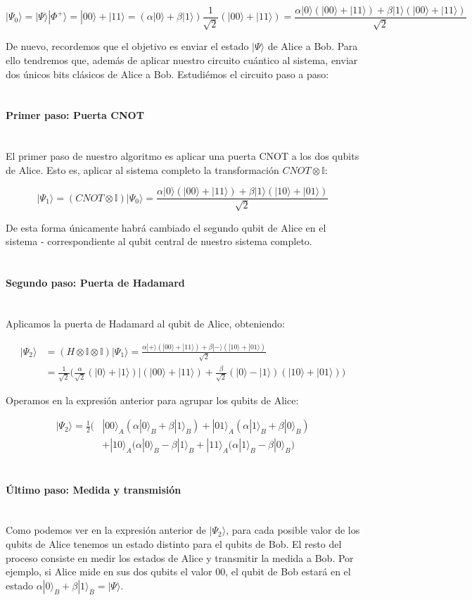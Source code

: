 \documentclass[11pt]{article}
\newcommand{\I}{\mathbb{I}}
\newcommand{\ra}{\rangle}
\newcommand{\myparagraph}[1]{\paragraph*{ \\ #1}\mbox{}\\}
\theoremstyle{plain}
\begin{document}
\[
	|\Psi_0\ra = |\Psi\ra|\Phi^+\ra = |00\ra + |11\ra = (\alpha|0\ra + \beta|1\ra) \frac{1}{\sqrt 2}(|00\ra + |11\ra) = \frac{\alpha|0\ra (|00\ra + |11\ra) + \beta|1\ra (|00\ra + |11\ra) }{\sqrt 2}
\]

De nuevo, recordemos que el objetivo es enviar el estado $|\Psi\ra$ de Alice a Bob. Para ello tendremos que, además de aplicar nuestro circuito cuántico al sistema, enviar dos únicos bits clásicos de Alice a Bob. Estudiémos el circuito paso a paso:

\myparagraph{Primer paso: Puerta CNOT}

El primer paso de nuestro algoritmo es aplicar una puerta CNOT a los dos qubits de Alice. Esto es, aplicar al sistema completo la transformación $CNOT \otimes \I$:


\[
	|\Psi_1\ra = (CNOT \otimes \I)|\Psi_0\ra = \frac{\alpha|0\ra (|00\ra + |11\ra) + \beta|1\ra (|10\ra + |01\ra) }{\sqrt 2}
\]

De esta forma únicamente habrá cambiado el segundo qubit de Alice en el sistema - correspondiente al qubit central de nuestro sistema completo.

\myparagraph{Segundo paso: Puerta de Hadamard}

Aplicamos la puerta de Hadamard al qubit de Alice, obteniendo:

\begin{align*}
	|\Psi_2\ra 	& = (H \otimes \I \otimes \I)|\Psi_1\ra = \frac{\alpha|+\ra (|00\ra + |11\ra) + \beta|-\ra (|10\ra + |01\ra) }{\sqrt 2} \\
				& = \frac{1}{\sqrt 2} \bigg( \frac{\alpha}{\sqrt 2}(|0\ra + |1\ra) | (|00\ra + |11\ra) + \frac{\beta}{\sqrt 2}(|0\ra - |1\ra) (|10\ra + |01\ra) \bigg)
\end{align*}

Operamos en la expresión anterior para agrupar los qubits de Alice:

\begin{align*}
|\Psi_2\ra  = \frac{1}{2} \bigg( 	& |00\ra_A (\alpha|0\ra_B + \beta|1\ra_B) + |01\ra_A (\alpha|1\ra_B + \beta|0\ra_B) \\
			 						& + |10\ra_A (\alpha|0\ra_B - \beta|1\ra_B + |11\ra_A (\alpha|1\ra_B - \beta|0\ra_B \bigg)
\end{align*}

\myparagraph{Último paso: Medida y transmisión}

Como podemos ver en la expresión anterior de $|\Psi_2\ra$, para cada posible valor de los qubits de Alice tenemos un estado distinto para el qubits de Bob. El resto del proceso consiste en medir los estados de Alice y transmitir la medida a Bob. Por ejemplo, si Alice mide en sus dos qubits el valor $00$, el qubit de Bob estará en el estado $\alpha|0\ra_B + \beta|1\ra_B = |\Psi\ra$. \\
\end{document}
